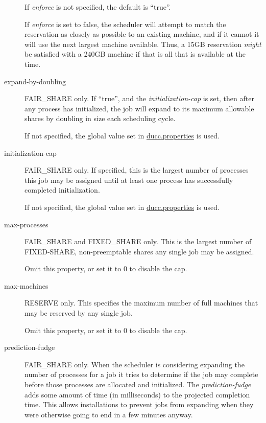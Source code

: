 \begin{description}
        If {\em enforce} is not specified, the default is ``true''.

        If {\em enforce} is set to false, the scheduler will attempt to match the reservation as 
        closely as possible to an existing machine, and if it cannot it will use the next largest
        machine available.  Thus, a 15GB reservation {\em might} be satisfied with a 240GB machine if
        that is all that is available at the time.

      \item[expand-by-doubling] FAIR\_SHARE only.  If ``true'', and the {\em initialization-cap} is
        set, then after any process has initialized, the job will expand to its maximum allowable
        shares by doubling in size each scheduling cycle.  

        If not specified, the global value set in \hyperref[sec:ducc.properties]{ducc.properties} is used.

      \item[initialization-cap] FAIR\_SHARE only. If specified, this is the largest number of processes this job
        may be assigned until at least one process has successfully completed initialization.

        If not specified, the global value set in \hyperref[sec:ducc.properties]{ducc.properties} is used.

      \item[max-processes] FAIR\_SHARE and FIXED\_SHARE only.  This is the largest number of FIXED-SHARE,
        non-preemptable shares any single job may be assigned.

        Omit this property, or set it to 0 to disable the cap.

      \item[max-machines] RESERVE only.  This specifies the maximum number of full machines that
        may be reserved by any single job.

        Omit this property, or set it to 0 to disable the cap.

      \item[prediction-fudge] FAIR\_SHARE only. When the scheduler is considering expanding the
        number of processes for a job it tries to determine if the job may complete before those
        processes are allocated and initialized.  The {\em prediction-fudge} adds some amount of 
        time (in milliseconds) to the projected completion time.  This allows installations to
        prevent jobs from expanding when they were otherwise going to end in a few minutes
        anyway.


\end{description}
